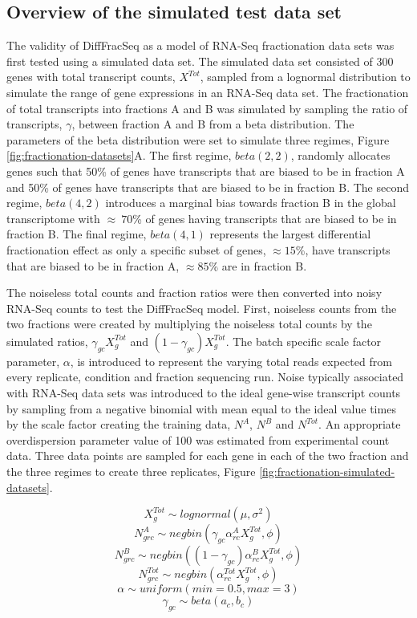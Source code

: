 \documentclass[../main.tex]{subfiles}
\begin{document}
\subsection{Overview of the simulated test data set}
The validity of DiffFracSeq as a model of RNA-Seq fractionation data sets was first tested using a simulated data set.
The simulated data set consisted of 300 genes with total transcript counts, $X^{Tot}$, sampled from a lognormal distribution to simulate the range of gene expressions in an RNA-Seq data set.
The fractionation of total transcripts into fractions A and B was simulated by sampling the ratio of transcripts, $\gamma$, between fraction A and B from a beta distribution.
The parameters of the beta distribution were set to simulate three regimes, Figure \ref{fig:fractionation-datasets}A.
The first regime, $beta(2,2)$, randomly allocates genes such that 50\% of genes have transcripts that are biased to be in fraction A and 50\% of genes have transcripts that are biased to be in fraction B.
The second regime, $beta(4,2)$ introduces a marginal bias towards fraction B in the global transcriptome with $\approx~70$\% of genes having transcripts that are biased to be in fraction B.
The final regime, $beta(4,1)$ represents the largest differential fractionation effect as only a specific subset of genes, $\approx15$\%, have transcripts that are biased to be in fraction A, $\approx85$\% are in fraction B.

The noiseless total counts and fraction ratios were then converted into noisy RNA-Seq counts to test the DiffFracSeq model.
First, noiseless counts from the two fractions were created by multiplying the noiseless total counts by the simulated ratios, $\gamma_{gc}X^{Tot}_g$ and $(1-\gamma_{gc})X^{Tot}_g$. 
The batch specific scale factor parameter, $\alpha$, is introduced to represent the varying total reads expected from every replicate, condition and fraction sequencing run.
Noise typically associated with RNA-Seq data sets was introduced to the ideal gene-wise transcript counts by sampling from a negative binomial with mean equal to the ideal value times by the scale factor creating the training data, $N^{A}$, $N^{B}$ and $N^{Tot}$.
An appropriate overdispersion parameter value of 100 was estimated from experimental count data.
Three data points are sampled for each gene in each of the two fraction and the three regimes to create three replicates, Figure \ref{fig:fractionation-simulated-datasets}.

$$X^{Tot}_g \sim lognormal(\mu, \sigma^2)$$
$$N^{A}_{grc} \sim negbin(\gamma_{gc}\alpha^{A}_{rc}X^{Tot}_g,\phi)$$
$$N^{B}_{grc} \sim negbin((1-\gamma_{gc})\alpha^{B}_{rc}X^{Tot}_g,\phi)$$
$$N^{Tot}_{grc} \sim negbin(\alpha^{Tot}_{rc}X^{Tot}_g,\phi)$$
$$\alpha \sim uniform(min=0.5, max=3)$$
$$\gamma_{gc}\sim beta(a_c,b_c)$$
\end{document}
